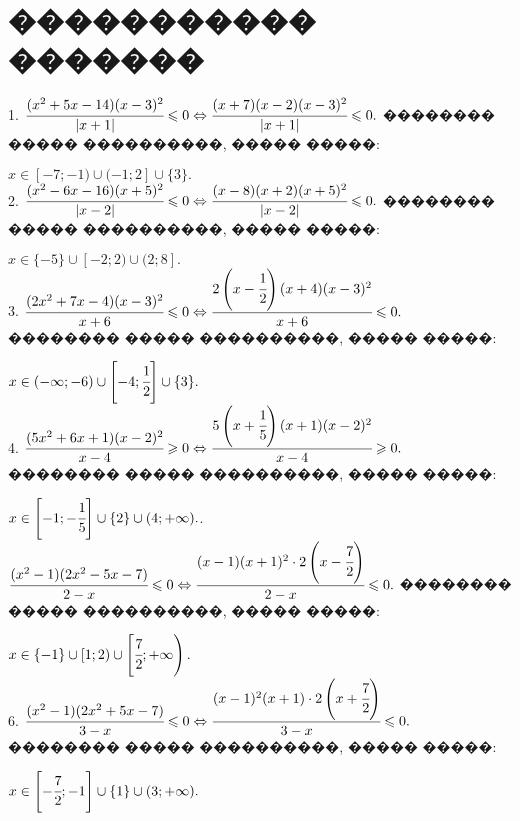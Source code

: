 \documentclass[12pt]{article}
\begin{document}
\section{����������� �������}
1. $\cfrac{(x^2+5x-14)(x-3)^2}{|x+1|}\leqslant0\Leftrightarrow\cfrac{(x+7)(x-2)(x-3)^2}{|x+1|}\leqslant0.$ �������� ����� ����������, ����� �����:
\begin{figure}[ht!]
\end{figure}
$x\in[-7;-1)\cup(-1;2]\cup\{3\}.$\\
2. $\cfrac{(x^2-6x-16)(x+5)^2}{|x-2|}\leqslant0\Leftrightarrow\cfrac{(x-8)(x+2)(x+5)^2}{|x-2|}\leqslant0.$ �������� ����� ����������, ����� �����:
\begin{figure}[ht!]
\end{figure}
$x\in\{-5\}\cup[-2;2)\cup(2;8].$\\
3. $\cfrac{(2x^2+7x-4)(x-3)^2}{x+6}\leqslant0\Leftrightarrow\cfrac{2\left(x-\cfrac{1}{2}\right)(x+4)(x-3)^2}{x+6}\leqslant0.$ �������� ����� ����������, ����� �����:
\begin{figure}[ht!]
\end{figure}
$x\in(-\infty; -6)\cup\left[-4;\cfrac{1}{2}\right]\cup\{3\}.$\\
4. $\cfrac{(5x^2+6x+1)(x-2)^2}{x-4}\geqslant0\Leftrightarrow\cfrac{5\left(x+\cfrac{1}{5}\right)(x+1)(x-2)^2}{x-4}\geqslant0.$ �������� ����� ����������, ����� �����:
\begin{figure}[ht!]
\end{figure}
$x\in\left[-1;-\cfrac{1}{5}\right]\cup\{2\}\cup(4;+\infty).$\newpage{}. $\cfrac{(x^2-1)(2x^2-5x-7)}{2-x}\leqslant0\Leftrightarrow\cfrac{(x-1)(x+1)^2\cdot 2\left(x-\cfrac{7}{2}\right)}{2-x}\leqslant0.$ �������� ����� ����������, ����� �����:
\begin{figure}[ht!]
\end{figure}
$x\in\{-1\}\cup[1;2)\cup\left[\cfrac{7}{2};+\infty\right).$\\
6. $\cfrac{(x^2-1)(2x^2+5x-7)}{3-x}\leqslant0\Leftrightarrow\cfrac{(x-1)^2(x+1)\cdot 2\left(x+\cfrac{7}{2}\right)}{3-x}\leqslant0.$ �������� ����� ����������, ����� �����:
\begin{figure}[ht!]
\end{figure}
$x\in\left[-\cfrac{7}{2};-1\right]\cup\{1\}\cup(3;+\infty).$\\
\end{document}
